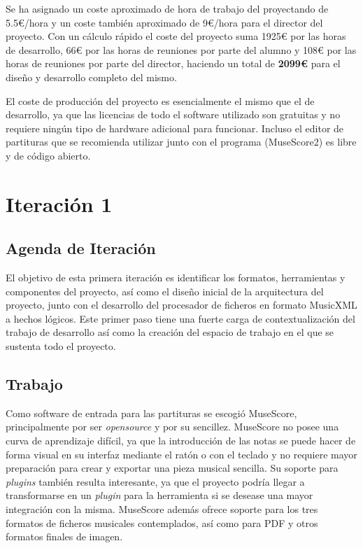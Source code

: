 Se ha asignado un coste aproximado de hora de trabajo del proyectando de 5.5\euro{}/hora y un coste también aproximado de 9\euro{}/hora para el director del proyecto. Con un cálculo rápido el coste del proyecto suma 1925\euro{} por las horas de desarrollo, 66\euro{} por las horas de reuniones por parte del alumno y 108\euro{} por las horas de reuniones por parte del director, haciendo un total de \textbf{2099\euro{}} para el diseño y desarrollo completo del mismo.

El coste de producción del proyecto es esencialmente el mismo que el de desarrollo, ya que las licencias de todo el software utilizado son gratuitas y no requiere ningún tipo de hardware adicional para funcionar. Incluso el editor de partituras que se recomienda utilizar junto con el programa (MuseScore2) es libre y de código abierto.

\section{Iteración 1}
\label{sec:first_iteration}
\subsection{Agenda de Iteración}
\label{subsec:first_iteration_backlog}
El objetivo de esta primera iteración es identificar los formatos, herramientas y componentes del proyecto, así como el diseño inicial de la arquitectura del proyecto, junto con el desarrollo del procesador de ficheros en formato MusicXML a hechos lógicos. Este primer paso tiene una fuerte carga de contextualización del trabajo de desarrollo así como la creación del espacio de trabajo en el que se sustenta todo el proyecto.

\subsection{Trabajo}
\label{subsec:first_iteration_work}
Como software de entrada para las partituras se escogió MuseScore, principalmente por ser \textit{opensource} y por su sencillez. MuseScore no posee una curva de aprendizaje difícil, ya que la introducción de las notas se puede hacer de forma visual en su interfaz mediante el ratón o con el teclado y no requiere mayor preparación para crear y exportar una pieza musical sencilla. Su soporte para \textit{plugins} también resulta interesante, ya que el proyecto podría llegar a transformarse en un \textit{plugin} para la herramienta si se desease una mayor integración con la misma. MuseScore además ofrece soporte para los tres formatos de ficheros musicales contemplados, así como para PDF y otros formatos finales de imagen.

